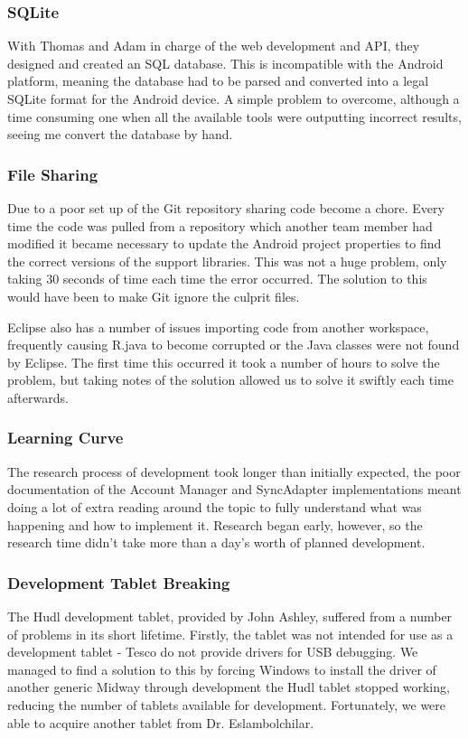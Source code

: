 \documentclass[11pt,a4paper]{report}
\begin{document}
\subsubsection{SQLite}
With Thomas and Adam in charge of the web development and API, they designed and created an SQL database. This is incompatible with the Android platform, meaning the database had to be parsed and converted into a legal SQLite format for the Android device. A simple problem to overcome, although a time consuming one when all the available tools were outputting incorrect results, seeing me convert the database by hand.

\subsubsection{File Sharing}
Due to a poor set up of the Git repository sharing code become a chore. Every time the code was pulled from a repository which another team member had modified it became necessary to update the Android project properties to find the correct versions of the support libraries. This was not a huge problem, only taking 30 seconds of time each time the error occurred. The solution to this would have been to make Git ignore the culprit files.

Eclipse also has a number of issues importing code from another workspace, frequently causing R.java to become corrupted or the Java classes were not found by Eclipse. The first time this occurred it took a number of hours to solve the problem, but taking notes of the solution allowed us to solve it swiftly each time afterwards.

\subsubsection{Learning Curve}
The research process of development took longer than initially expected, the poor documentation of the Account Manager and SyncAdapter implementations meant doing a lot of extra reading around the topic to fully understand what was happening and how to implement it. Research began early, however, so the research time didn't take more than a day's worth of planned development.

\subsubsection{Development Tablet Breaking}
The Hudl development tablet, provided by John Ashley, suffered from a number of problems in its short lifetime. Firstly, the tablet was not intended for use as a development tablet - Tesco do not provide drivers for USB debugging. We managed to find a solution to this by forcing Windows to install the driver of another generic 
Midway through development the Hudl tablet stopped working, reducing the number of tablets available for development. Fortunately, we were able to acquire another tablet from Dr. Eslambolchilar.
\end{document}
